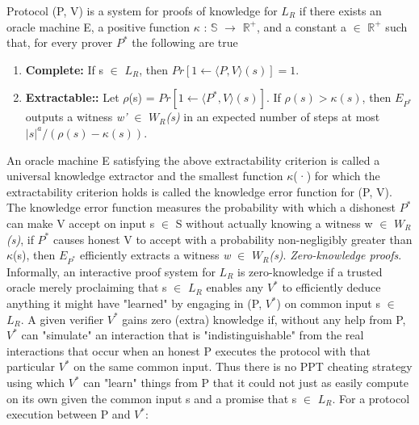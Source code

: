\documentclass[a4paper]{article}
\begin{document}
\newline
Protocol (P, V) is a system for proofs of knowledge for \textit{$L_R$} if there exists an oracle machine E, a positive function \(\kappa\) : $\mathbb{S}$ \(\to\) $\mathbb{R}^{+}$, and a constant a $\in$ $\mathbb{R}^{+}$ such that, for every prover \textit{$P^{*}$} the following are true
\begin{enumerate}
  \item \textbf{Complete:}  If s $\in$ \textit{$L_R$}, then $Pr[1 \gets \langle P, V \rangle (s)] = 1$.
  \item \textbf{Extractable::}  Let \(\rho\)(s) = $Pr[1 \gets \langle P^{*}, V \rangle (s)]$. If $\rho(s) > \kappa(s)$, then $E_{P^{*}}$ outputs a witness \textit{w'} $\in$ \textit{$W_R$(s)} in an expected number of steps at most $ |s|^{a} / (\rho(s) - \kappa(s)) $.
\end{enumerate}
An oracle machine E satisfying the above extractability criterion is called a universal knowledge extractor and the smallest function \(\kappa\)(·) for which the extractability criterion holds  is called the knowledge error function for (P, V). The knowledge error function measures the probability with which a dishonest \textit{$P^{*}$} can make V accept on input s $\in$ S without actually knowing a witness w $\in$ \textit{$W_R$(s)}, if \textit{$P^{*}$} causes honest V to accept with a probability non-negligibly greater than \(\kappa\)(s), then $E_{P^{*}}$ efficiently extracts a witness \textit{w} $\in$ \textit{$W_R$(s)}.
\newline
\textit{Zero-knowledge proofs}. Informally, an interactive proof system for \textit{$L_R$} is zero-knowledge if a trusted oracle merely proclaiming that s $\in$ \textit{$L_R$} enables any \textit{$V^{*}$} to efficiently deduce anything it might have "learned" by engaging in (P, ${V^{*}}$) on common input s $\in$ \textit{$L_R$}. A given verifier ${V^{*}}$ gains zero (extra) knowledge if, without any help from P, ${V^{*}}$ can "simulate" an interaction that is "indistinguishable" from the real interactions that occur when an honest P executes the protocol with that particular ${V^{*}}$ on the same common input. Thus there is no PPT cheating strategy using which ${V^{*}}$ can "learn" things from P that it could not just as easily compute on its own given the common input s and a promise that s $\in$ \textit{$L_R$}.
\newline
For a protocol execution between P and ${V^{*}}$: 
\end{document}
